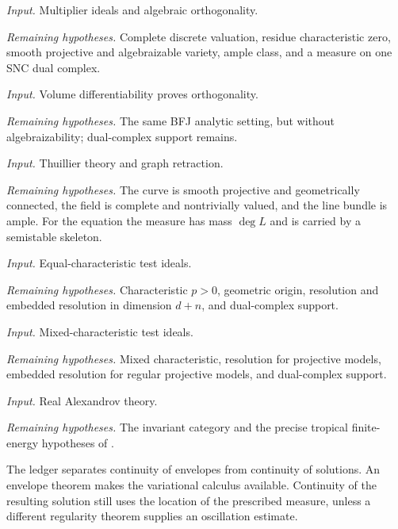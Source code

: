 \begin{description}[style=nextline,leftmargin=0pt,labelindent=0pt,
  labelsep=0pt,itemsep=.8\baselineskip,font=\normalfont\bfseries]
\item[BFJ 2015]
\emph{Input.} Multiplier ideals and algebraic orthogonality.
\par\emph{Remaining hypotheses.} Complete discrete valuation, residue
characteristic zero, smooth projective and algebraizable variety, ample
class, and a measure on one SNC dual complex.

\item[BGGJKM 2020]
\emph{Input.} Volume differentiability proves orthogonality.
\par\emph{Remaining hypotheses.} The same BFJ analytic setting, but without
algebraizability; dual-complex support remains.

\item[Curves]
\emph{Input.} Thuillier theory and graph retraction.
\par\emph{Remaining hypotheses.} The curve is smooth projective and
geometrically connected, the field is complete and nontrivially valued,
and the line bundle is ample.  For the equation the measure has mass
\(\deg L\) and is carried by a semistable skeleton.

\item[GJKM 2019]
\emph{Input.} Equal-characteristic test ideals.
\par\emph{Remaining hypotheses.} Characteristic \(p>0\), geometric origin,
resolution and embedded resolution in dimension \(d+n\), and dual-complex
support.

\item[FGK 2025]
\emph{Input.} Mixed-characteristic test ideals.
\par\emph{Remaining hypotheses.} Mixed characteristic, resolution for
projective models, embedded resolution for regular projective models, and
dual-complex support.

\item[Toric or invariant setting]
\emph{Input.} Real Alexandrov theory.
\par\emph{Remaining hypotheses.} The invariant category and the precise
tropical finite-energy hypotheses of .
\end{description}

The ledger separates continuity of envelopes from continuity of solutions.
An envelope theorem makes the variational calculus available.  Continuity of
the resulting solution still uses the location of the prescribed measure,
unless a different regularity theorem supplies an oscillation estimate.

